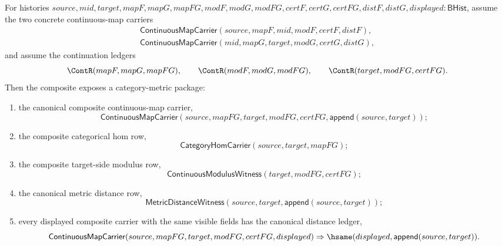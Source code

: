 \begin{theorem}
\label{thm:continuousmap-composition-category-metric-package}
For histories
$source,mid,target,mapF,mapG,mapFG,modF,modG,modFG,certF,certG,certFG,distF,distG,displayed:\mathsf{BHist}$,
assume the two concrete continuous-map carriers
$$
\begin{array}{l}
\mathsf{ContinuousMapCarrier}(source,mapF,mid,modF,certF,distF),\\
\mathsf{ContinuousMapCarrier}(mid,mapG,target,modG,certG,distG),
\end{array}
$$
and assume the continuation ledgers
$$
\ContR(mapF,mapG,mapFG),\qquad
\ContR(modF,modG,modFG),\qquad
\ContR(target,modFG,certFG).
$$
Then the composite exposes a category-metric package:
\begin{enumerate}
\item the canonical composite continuous-map carrier,
$$
\mathsf{ContinuousMapCarrier}
(source,mapFG,target,modFG,certFG,\mathsf{append}(source,target));
$$

\item the composite categorical hom row,
$$
\mathsf{CategoryHomCarrier}(source,target,mapFG);
$$

\item the composite target-side modulus row,
$$
\mathsf{ContinuousModulusWitness}(target,modFG,certFG);
$$

\item the canonical metric distance row,
$$
\mathsf{MetricDistanceWitness}(source,target,\mathsf{append}(source,target));
$$

\item every displayed composite carrier with the same visible fields has the
canonical distance ledger,
$$
\mathsf{ContinuousMapCarrier}(source,mapFG,target,modFG,certFG,displayed)
\Rightarrow \hsame(displayed,\mathsf{append}(source,target)).
$$
\end{enumerate}
\end{theorem}
